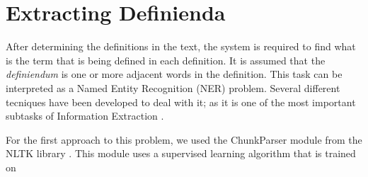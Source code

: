 \documentclass[a4paper]{easychair}
\begin{document}
\section{Extracting Definienda}
After determining the definitions in the text, the system is required to find what is the term that is being defined in each definition. It is assumed that the  \emph{definiendum} is one or more adjacent words in the definition. This task can be interpreted as a Named Entity Recognition (NER) problem. Several different tecniques have been developed to deal with it;  as it is one of the most important subtasks of Information Extraction \cite{nersurvey}.

 For the first approach to this problem, we used the ChunkParser module from the NLTK library \cite{nltk}. This module uses a supervised learning algorithm that is trained on 


\end{document}
